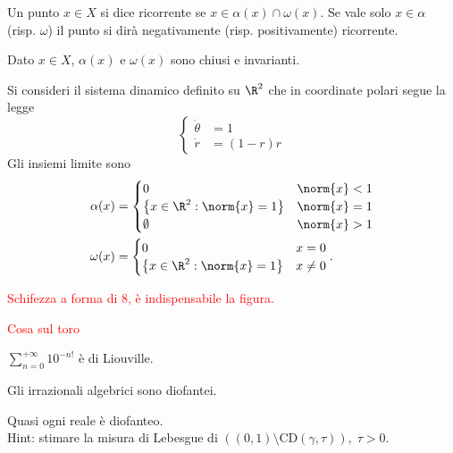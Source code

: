 \begin{definition}
    Un punto $ x\in X $ si dice ricorrente se $ x\in \alpha(x) \cap \omega(x) $. Se vale solo $ x\in \alpha $ (risp. $ \omega $) il punto si dirà negativamente (risp. positivamente) ricorrente.
\end{definition}
\begin{exercise}
    Dato $ x\in X $, $ \alpha(x) $ e $ \omega(x) $ sono chiusi e invarianti.
\end{exercise}

\begin{example}
    Si consideri il sistema dinamico definito su $\R^2$ che in coordinate polari segue la legge
    \[
        \begin{cases}
            \dot{\theta} & = 1      \\
            \dot{r}      & = (1-r)r
        \end{cases}
    \]
    Gli insiemi limite sono
    \begin{align*}
        \alpha(x) &=
        \begin{cases}
            0                                          & \norm{x} < 1 \\
            \left \{x \in \R^2: \norm{x} = 1 \right \} & \norm{x} = 1 \\
            \emptyset                                  & \norm{x} > 1
        \end{cases} \\
        \omega(x) &=
        \begin{cases}
            0 & x = 0 \\
            \left \{x \in \R^2: \norm{x} = 1 \right \} & x \neq 0
        \end{cases}.
    \end{align*}
\end{example}

\begin{example}
    \textcolor{red}{Schifezza a forma di 8, è indispensabile la figura.}
\end{example}

\begin{example}
    \textcolor{red}{Cosa sul toro}
\end{example}

\begin{exercise}

\end{exercise}

\begin{exercise}
    $ \sum_{n=0}^{+\infty} 10^{-n!} $ è di Liouville.
\end{exercise}
\begin{exercise}
    Gli irrazionali algebrici sono diofantei.
\end{exercise}
\begin{exercise}
    Quasi ogni reale è diofanteo.\\
    Hint: stimare la misura di Lebesgue di $ ( (0,1) \setminus \mathrm{CD}(\gamma,\tau) ),\; \tau > 0 $.
\end{exercise}
